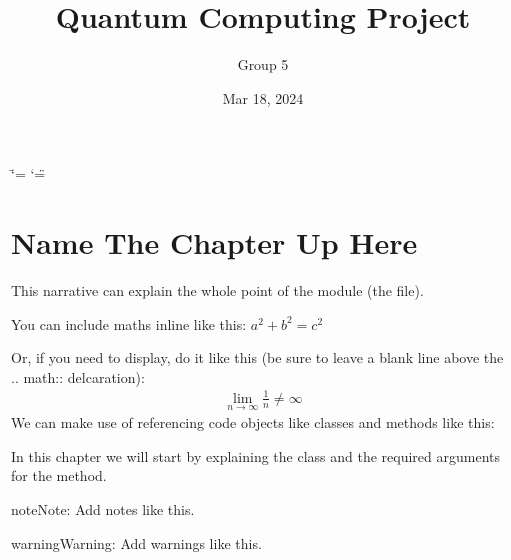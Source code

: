 \documentclass[letterpaper,10pt,english]{sphinxmanual}
\title{Quantum Computing Project}
\date{Mar 18, 2024}
\author{
Group 5
}
\begin{document}
\ifdefined\shorthandoff
  \ifnum\catcode`\=\string=\active\shorthandoff{=}\fi
  \ifnum\catcode`\"=\active{}\fi
\fi

\pagestyle{empty}
\sphinxmaketitle
\pagestyle{plain}
\sphinxtableofcontents
\pagestyle{normal}
\label{\detokenize{index::doc}}


\chapter{Name The Chapter Up Here}
\label{\detokenize{index:name-the-chapter-up-here}}\label{\detokenize{index:module-example}}
\sphinxAtStartPar
This narrative can explain the whole point of the module (the file).

\sphinxAtStartPar
You can include maths inline like this: \(a^2 + b^2 = c^2\)

\sphinxAtStartPar
Or, if you need to display, do it like this (be sure to leave a blank line
above the .. math:: delcaration):
\begin{equation*}
\begin{split}\lim_{n\to\infty} \frac{1}{n} \neq \infty\end{split}
\end{equation*}
\sphinxAtStartPar
We can make use of referencing code objects like classes and methods
like this:

\sphinxAtStartPar
In this chapter we will start by explaining the {\hyperref[\detokenize{index:example.Example}]{}} class
and the required arguments for the  method.

\begin{sphinxadmonition}{note}{Note:}
\sphinxAtStartPar
Add notes like this.
\end{sphinxadmonition}

\begin{sphinxadmonition}{warning}{Warning:}
\sphinxAtStartPar
Add warnings like this.
\end{sphinxadmonition}
\end{document}
